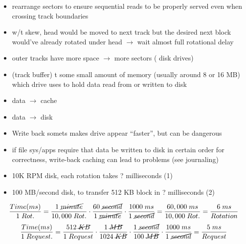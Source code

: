 \begin{minipage}{.55\linewidth}
  \flushleft
  \begin{itemize}
  \item {} rearrange sectors to ensure sequential reads to be properly served even when crossing track boundaries
  \item w/t skew, head would be moved to next track but the desired next block would've already rotated under head $\to$ wait almost full rotational delay
  \item outer tracks have more space $\to$ more sectors ( disk drives)
  \item {} (track buffer) t some small amount of memory (usually around 8 or 16 MB) which drive uses to hold data read from or written to disk
  \item {} data $\to$ cache
  \item {} data $\to$ disk
  \end{itemize}
\end{minipage}
\begin{itemize}
\item Write back somets makes drive appear ``faster'', but can be dangerous
\item  if file sys/apps require that data be written to disk in certain order for correctness, write-back caching can lead to problems (see journaling)
\item 10K RPM disk, each rotation takes ? milliseconds (1)
\item 100 MB/second disk, to transfer 512 KB block in ? milliseconds (2)
\end{itemize}
\[
  \frac{Time(ms)}{1\;Rot.} = \frac{1\;\cancel{minute}}{10,000\;Rot.}\cdot \frac{60\; \cancel{second}}{1\;\cancel{minute}}\cdot \frac{1000\;ms}{1\;\cancel{second}} = \frac{60,000\;ms}{10,000\;Rot.} = \frac{6\;ms}{Rotation}
\]
\[
  \frac{Time(ms)}{1\;Request.} = \frac{512\;\cancel{KB}}{1\;Request}\cdot \frac{1\;\cancel{MB}}{1024\;\cancel{KB}}\cdot \frac{1\;\cancel{second}}{100\;\cancel{MB}}\cdot \frac{1000\;ms}{1\;\cancel{second}} = \frac{5\;ms}{Request}
\]
